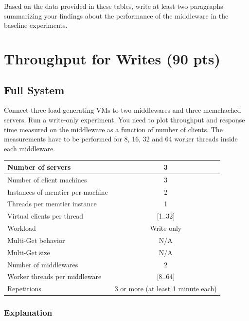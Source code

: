 \documentclass[11pt,a4paper]{article}
\begin{document}
Based on the data provided in these tables, write at least two paragraphs summarizing your findings about the performance of the middleware in the baseline experiments.

\section{Throughput for Writes (90 pts)}

\subsection{Full System}

Connect three load generating VMs to two middlewares and three memchached servers. Run a write-only experiment. 
You need to plot throughput and response time measured on the middleware as a function of number of clients. The measurements have to be performed for 8, 16, 32 and 64 worker threads inside each middleware.

\begin{center}
	\scriptsize{
		\begin{tabular}{|l|c|}
			\hline Number of servers                & 3          \\ 
			\hline Number of client machines        & 3          \\ 
			\hline Instances of memtier per machine & 2          \\ 
			\hline Threads per memtier instance     & 1          \\
			\hline Virtual clients per thread       & [1..32]    \\ 
			\hline Workload                         & Write-only \\
			\hline Multi-Get behavior               & N/A        \\
			\hline Multi-Get size                   & N/A        \\
			\hline Number of middlewares            & 2          \\
			\hline Worker threads per middleware    & [8..64]    \\
			\hline Repetitions                      & 3 or more (at least 1 minute each)  \\ 
			\hline 
		\end{tabular}
	} 
\end{center}

\subsubsection{Explanation}
\end{document}
